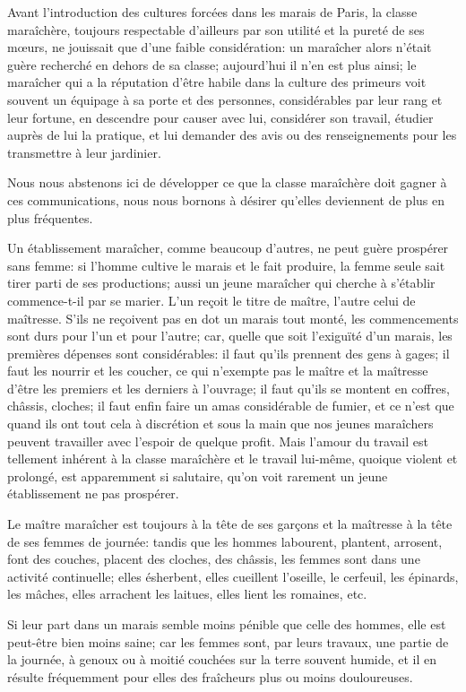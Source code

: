 \documentclass[10pt,a4paper]{book}
\begin{document}
Avant l'introduction des cultures forcées dans les marais de Paris, la classe maraîchère, toujours respectable d'ailleurs par son utilité et la pureté de ses mœurs, ne jouissait que d'une faible considération: un maraîcher alors n'était guère recherché en dehors de sa classe; aujourd'hui il n'en est plus ainsi; le maraîcher qui a la réputation d'être habile dans la culture des primeurs voit souvent un équipage à sa porte et des personnes, considérables par leur rang et leur fortune, en descendre pour causer avec lui, considérer son travail, étudier auprès de lui la pratique, et lui demander des avis ou des renseignements pour les transmettre à leur jardinier.

Nous nous abstenons ici de développer ce que la classe maraîchère doit gagner à ces communications, nous nous bornons à désirer qu'elles deviennent de plus en plus fréquentes.

Un établissement maraîcher, comme beaucoup d'autres, ne peut guère prospérer sans femme: si l'homme cultive le marais et le fait produire, la femme seule sait tirer parti de ses productions; aussi un jeune maraîcher qui cherche à s'établir commence-t-il par se marier. L'un reçoit le titre de maître, l'autre celui de maîtresse. S'ils ne reçoivent pas en dot un marais tout monté, les commencements sont durs pour l'un et pour l'autre; car, quelle que soit l'exiguïté d'un marais, les premières dépenses sont considérables: il faut qu'ils prennent des gens à gages; il faut les nourrir et les coucher, ce qui n'exempte pas le maître et la maîtresse d'être les premiers et les derniers à l'ouvrage; il faut qu'ils se montent en coffres, châssis, cloches; il faut enfin faire un amas considérable de fumier, et ce n'est que quand ils ont tout cela à discrétion et sous la main que nos jeunes maraîchers peuvent travailler avec l'espoir de quelque profit. Mais l'amour du travail est tellement inhérent à la classe maraîchère et le travail lui-même, quoique violent et prolongé, est apparemment si salutaire, qu'on voit rarement un jeune établissement ne pas prospérer.

Le maître maraîcher est toujours à la tête de ses garçons et la maîtresse à la tête de ses femmes de journée: tandis que les hommes labourent, plantent, arrosent, font des couches, placent des cloches, des châssis, les femmes sont dans une activité continuelle; elles ésherbent, elles cueillent l'oseille, le cerfeuil, les épinards, les mâches, elles arrachent les laitues, elles lient les romaines, etc.

Si leur part dans un marais semble moins pénible que celle des hommes, elle est peut-être bien moins saine; car les femmes sont, par leurs travaux, une partie de la journée, à genoux ou à moitié couchées sur la terre souvent humide, et il en résulte fréquemment pour elles des fraîcheurs plus ou moins douloureuses.
\end{document}
